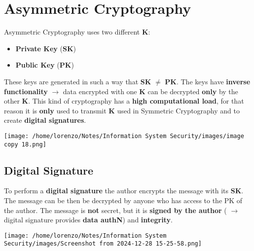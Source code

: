 \section{Asymmetric Cryptography}
\begin{minipage}{0.6\textwidth}
Asymmetric Cryptography uses two different \textbf{K}:
\begin{itemize}
    \item \textbf{Private Key} (\textbf{SK})
    \item \textbf{Public Key} (\textbf{PK})
\end{itemize}
These keys are generated in such a way that \textbf{SK} \(\neq\) \textbf{PK}. The keys have \textbf{inverse functionality} \(\rightarrow \) data encrypted with one \textbf{K} can be decrypted \textbf{only} by the other \textbf{K}. This kind of cryptography has a \textbf{high computational load}, for that reason it is \textbf{only} used to transmit \textbf{K} used in Symmetric Cryptography and to create \textbf{digital signatures}.
\end{minipage} 
\hspace{0.3cm}
\begin{minipage}{0.4\textwidth}
    \centering
    \texttt{[image: /home/lorenzo/Notes/Information System Security/images/image copy 18.png]}
\end{minipage}

\subsection{Digital Signature}
\begin{minipage}{0.6\textwidth}
	\vspace{-0.3cm}
To perform a \textbf{digital signature} the author encrypts the message with its \textbf{SK}. The message can be then be decrypted by anyone who has access to the PK of the author. The message is \textbf{not} secret, but it is \textbf{signed by the author} (
    \(\rightarrow \) digital signature provides \textbf{data authN}) and \textbf{integrity}.
\end{minipage} 
\hspace{0.3cm}
\begin{minipage}{0.4\textwidth}
    \centering
    \texttt{[image: /home/lorenzo/Notes/Information System Security/images/Screenshot from 2024-12-28 15-25-58.png]}
\end{minipage}
